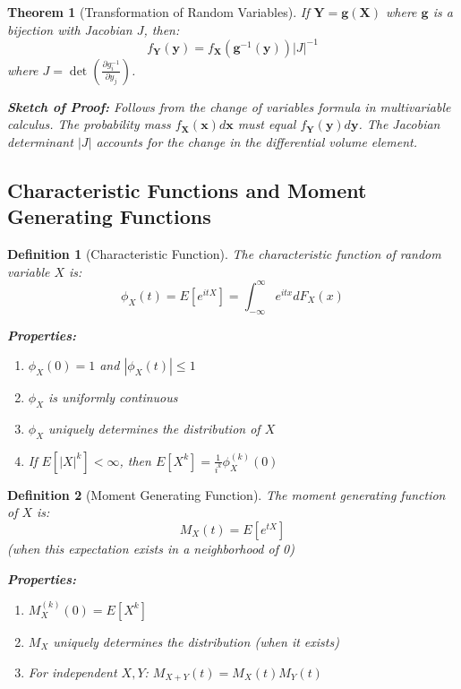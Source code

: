 \documentclass[12pt,a4paper]{article}
\newtheorem{theorem}{Theorem}[section]
\newtheorem{definition}{Definition}[section]
\theoremstyle{remark}
\begin{document}
\begin{theorem}[Transformation of Random Variables]
If $\mathbf{Y} = \mathbf{g}(\mathbf{X})$ where $\mathbf{g}$ is a bijection with Jacobian $J$, then:
$$f_{\mathbf{Y}}(\mathbf{y}) = f_{\mathbf{X}}(\mathbf{g}^{-1}(\mathbf{y})) |J|^{-1}$$
where $J = \det\left(\frac{\partial g_i^{-1}}{\partial y_j}\right)$.

\textbf{Sketch of Proof:} Follows from the change of variables formula in multivariable calculus. The probability mass $f_{\mathbf{X}}(\mathbf{x})d\mathbf{x}$ must equal $f_{\mathbf{Y}}(\mathbf{y})d\mathbf{y}$. The Jacobian determinant $|J|$ accounts for the change in the differential volume element.
\end{theorem}

\subsection{Characteristic Functions and Moment Generating Functions}

\begin{definition}[Characteristic Function]
The characteristic function of random variable $X$ is:
$$\phi_X(t) = E[e^{itX}] = \int_{-\infty}^{\infty} e^{itx} dF_X(x)$$

\textbf{Properties:}
\begin{enumerate}
\item $\phi_X(0) = 1$ and $|\phi_X(t)| \leq 1$
\item $\phi_X$ is uniformly continuous
\item $\phi_X$ uniquely determines the distribution of $X$
\item If $E[|X|^k] < \infty$, then $E[X^k] = \frac{1}{i^k}\phi_X^{(k)}(0)$
\end{enumerate}
\end{definition}

\begin{definition}[Moment Generating Function]
The moment generating function of $X$ is:
$$M_X(t) = E[e^{tX}]$$
(when this expectation exists in a neighborhood of 0)

\textbf{Properties:}
\begin{enumerate}
\item $M_X^{(k)}(0) = E[X^k]$
\item $M_X$ uniquely determines the distribution (when it exists)
\item For independent $X, Y$: $M_{X+Y}(t) = M_X(t)M_Y(t)$
\end{enumerate}
\end{definition}
\end{document}
